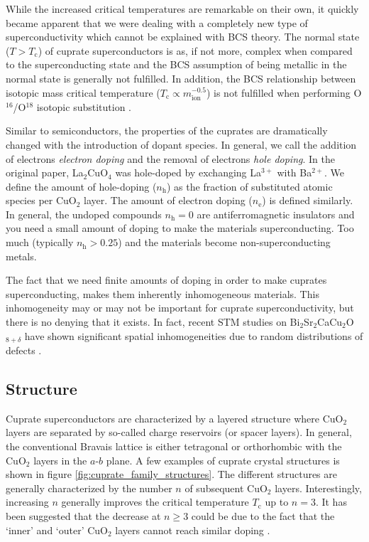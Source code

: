 While the increased critical temperatures are remarkable on their own, it quickly became apparent that we were dealing with a completely new type of superconductivity which cannot be explained with BCS theory. The normal state ($T > T_\text{c}$) of cuprate superconductors is as, if not more, complex when compared to the superconducting state and the BCS assumption of being metallic in the normal state is generally not fulfilled. In addition, the BCS relationship between isotopic mass critical temperature ($T_\text{c} \propto m_\text{ion}^{-0.5}$) is not fulfilled when performing O$^{16}$/O$^{18}$ isotopic substitution \cite{Suryadijaya2005}.

Similar to semiconductors, the properties of the cuprates are dramatically changed with the introduction of dopant species. In general, we call the addition of electrons \emph{electron doping} and the removal of electrons \emph{hole doping}. In the original paper, La$_2$CuO$_4$ was hole-doped by exchanging La$^{3+}$ with Ba$^{2+}$. We define the amount of hole-doping ($n_\text{h}$) as the fraction of substituted atomic species per CuO$_2$ layer. The amount of electron doping ($n_\text{e}$) is defined similarly. In general, the undoped compounds $n_\text{h} = 0$ are antiferromagnetic insulators and you need a small amount of doping to make the materials superconducting. Too much (typically $n_\text{h} > 0.25$) and the materials become non-superconducting metals. 

The fact that we need finite amounts of doping in order to make cuprates superconducting, makes them inherently inhomogeneous materials. This inhomogeneity may or may not be important for cuprate superconductivity, but there is no denying that it exists. In fact, recent STM studies on Bi$_2$Sr$_2$CaCu$_2$O$_{8+\delta}$ have shown significant spatial inhomogeneities due to random distributions of defects \cite{Ruan2018}. %

\subsection{Structure}
Cuprate superconductors are characterized by a layered structure where CuO$_2$ layers are separated by so-called charge reservoirs (or spacer layers). In general, the conventional Bravais lattice is either tetragonal or orthorhombic with the CuO$_2$ layers in the $a$-$b$ plane. A few examples of cuprate crystal structures is shown in figure \ref{fig:cuprate_family_structures}. The different structures are generally characterized by the number $n$ of subsequent CuO$_2$ layers. Interestingly, increasing $n$ generally improves the critical temperature $T_\text{c}$ up to $n = 3$. It has been suggested that the decrease at $n \geq 3$ could be due to the fact that the `inner' and `outer' CuO$_2$ layers cannot reach similar doping \cite{Wesche2017}.

